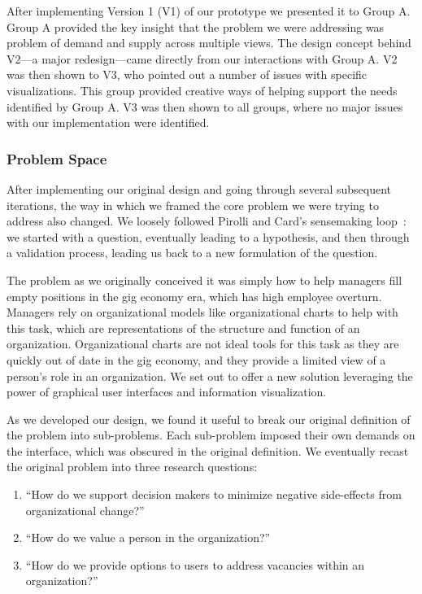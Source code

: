 \documentclass[journal]{vgtc}                %
\begin{document}
After implementing Version 1 (V1) of our prototype we presented it to Group A. Group A provided the key insight that the problem we were addressing was problem of demand and supply across multiple views. The design concept behind V2---a major redesign---came directly from our interactions with Group A. V2 was then shown to V3, who pointed out a number of issues with specific visualizations.  This group provided creative ways of helping support the needs identified by Group A. V3 was then shown to all groups, where no major issues with our implementation were identified.

\subsubsection{Problem Space}
\label{sec:problem}
After implementing our original design and going through several subsequent iterations, the way in which we framed the core problem we were trying to address also changed. We loosely followed Pirolli and Card's sensemaking loop~\cite{pirolli2005sensemaking}: we started with a question, eventually leading to a hypothesis, and then through a validation process, leading us back to a new formulation of the question.  

The problem as we originally conceived it was simply how to help managers fill empty positions in the gig economy era, which has high employee overturn. Managers rely on organizational models like organizational charts to help with this task, which are representations of the structure and function of an organization. Organizational charts are not ideal tools for this task as they are quickly out of date in the gig economy, and they provide a limited view of a person's role in an organization. We set out to offer a new solution leveraging the power of graphical user interfaces and information visualization. 

As we developed our design, we found it useful to break our original definition of the problem into sub-problems. Each sub-problem imposed their own demands on the interface, which was obscured in the original definition. We eventually recast the original problem into three research questions: 

\begin{enumerate}
\item “How do we support decision makers to minimize negative side-effects from organizational change?”
\item “How do we value a person in the organization?”
\item “How do we provide options to users to address vacancies within an organization?”
\end{enumerate}
\end{document}
